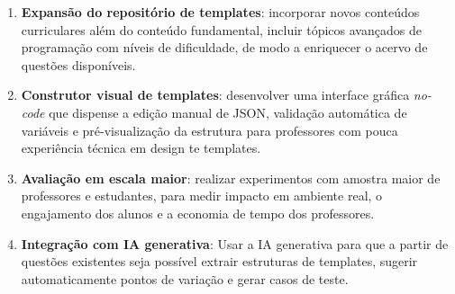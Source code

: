 \begin{enumerate}[label=\alph*)]
  \item \textbf{Expansão do repositório de templates}: incorporar novos conteúdos curriculares além do conteúdo fundamental, incluir tópicos avançados de programação com níveis de dificuldade, de modo a enriquecer o acervo de questões disponíveis.
  \item \textbf{Construtor visual de templates}: desenvolver uma interface gráfica \emph{no-code} que dispense a edição manual de JSON, validação automática de variáveis e pré-visualização da estrutura para professores com pouca experiência técnica em design te templates.
  \item \textbf{Avaliação em escala maior}: realizar experimentos com amostra maior de professores e estudantes, para medir impacto em ambiente real, o engajamento dos alunos e a economia de tempo dos professores.
  \item \textbf{Integração com IA generativa}: Usar a IA generativa para que a partir de questões existentes seja possível extrair estruturas de templates, sugerir automaticamente pontos de variação e gerar casos de teste.
\end{enumerate}



